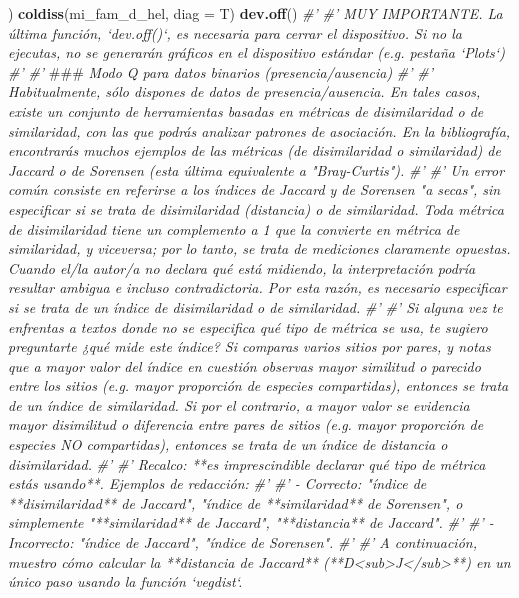 \documentclass[11pt,]{article}
\newenvironment{Shaded}{\begin{snugshade}}{\end{snugshade}}
\newcommand{\KeywordTok}[1]{\textcolor[rgb]{0.13,0.29,0.53}{\textbf{#1}}}
\newcommand{\DataTypeTok}[1]{\textcolor[rgb]{0.13,0.29,0.53}{#1}}
\newcommand{\CommentTok}[1]{\textcolor[rgb]{0.56,0.35,0.01}{\textit{#1}}}
\newcommand{\AlertTok}[1]{\textcolor[rgb]{0.94,0.16,0.16}{#1}}
\newcommand{\NormalTok}[1]{#1}
\begin{document}
\begin{Shaded}
\begin{Highlighting}[]
{\NormalTok{)}
\KeywordTok{coldiss}\NormalTok{(mi_fam_d_hel, }\DataTypeTok{diag =}\NormalTok{ T)}
\KeywordTok{dev.off}\NormalTok{()}
\CommentTok{#' }
\CommentTok{#' MUY IMPORTANTE. La última función, `dev.off()`, es necesaria para cerrar el dispositivo. Si no la ejecutas, no se generarán gráficos en el dispositivo estándar (e.g. pestaña `Plots`)}
\CommentTok{#' }
\CommentTok{#' }\AlertTok{###}\CommentTok{ Modo Q para datos binarios (presencia/ausencia)}
\CommentTok{#' }
\CommentTok{#' Habitualmente, sólo dispones de datos de presencia/ausencia. En tales casos, existe un conjunto de herramientas basadas en métricas de disimilaridad o de similaridad, con las que podrás analizar patrones de asociación. En la bibliografía, encontrarás muchos ejemplos de las métricas (de disimilaridad o similaridad) de Jaccard o de Sorensen (esta última equivalente a "Bray-Curtis").}
\CommentTok{#' }
\CommentTok{#' Un error común consiste en referirse a los índices de Jaccard y de Sorensen "a secas", sin especificar si se trata de disimilaridad (distancia) o de similaridad. Toda métrica de disimilaridad tiene un complemento a 1 que la convierte en métrica de similaridad, y viceversa; por lo tanto, se trata de mediciones claramente opuestas. Cuando el/la autor/a no declara qué está midiendo, la interpretación podría resultar ambigua e incluso contradictoria. Por esta razón, es necesario especificar si se trata de un índice de disimilaridad o de similaridad.}
\CommentTok{#' }
\CommentTok{#' Si alguna vez te enfrentas a textos donde no se especifica qué tipo de métrica se usa, te sugiero preguntarte ¿qué mide este índice? Si comparas varios sitios por pares, y notas que a mayor valor del índice en cuestión observas mayor similitud o parecido entre los sitios (e.g. mayor proporción de especies compartidas), entonces se trata de un índice de similaridad. Si por el contrario, a mayor valor se evidencia mayor disimilitud o diferencia entre pares de sitios (e.g. mayor proporción de especies NO compartidas), entonces se trata de un índice de distancia o disimilaridad.}
\CommentTok{#' }
\CommentTok{#' Recalco: **es imprescindible declarar qué tipo de métrica estás usando**. Ejemplos de redacción:}
\CommentTok{#' }
\CommentTok{#' - Correcto: "índice de **disimilaridad** de Jaccard", "índice de **similaridad** de Sorensen", o simplemente "**similaridad** de Jaccard", "**distancia** de Jaccard".}
\CommentTok{#' }
\CommentTok{#' - Incorrecto: "índice de Jaccard", "índice de Sorensen".}
\CommentTok{#' }
\CommentTok{#' A continuación, muestro cómo calcular la **distancia de Jaccard** (**D<sub>J</sub>**) en un único paso usando la función `vegdist`.}
}
\end{Highlighting}
\end{Shaded}
\end{document}
